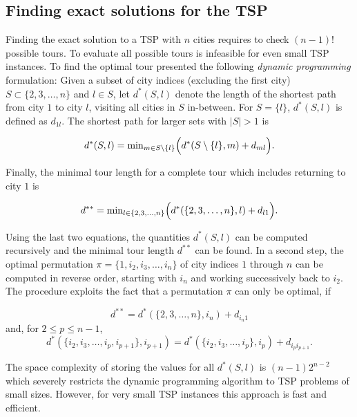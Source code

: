 \documentclass[10pt,a4paper,fleqn]{article}
\begin{document}
\subsection{Finding exact solutions for the TSP}\label{sec:exact}

Finding the exact solution to a TSP with $n$ cities requires to check $(n-1)!$
possible tours. To evaluate all possible tours is infeasible for even small TSP
instances. To find the optimal tour
\cite{Held1962} presented the following
\emph{dynamic programming} formulation: Given a subset of city indices 
(excluding the first city)
$S \subset \{2, 3, \dots, n\}$ and $l \in S$, let $d^*(S, l)$ denote the length of the
shortest path from city $1$ to city $l$, visiting all cities in $S$ in-between.
For $S = \{l\}$, $d^*(S,l)$ is defined as $d_{1l}$. The shortest path for
larger sets with $|S| > 1$ is

\begin{equation}
    d^*(S,l) = \mathrm{min}_{m \in S\setminus\{l\}}\Bigl( d^*(S\setminus\{l\},m) + d_{ml}\Bigl).
\end{equation}

Finally, the minimal tour length for a complete tour which includes returning
to city $1$ is

\begin{equation}
    d^{**} = \mathrm{min}_{l \in \{2,3,\dots,n\}}\Bigl( d^*(\{2,3,\dots,n\}, l)
    + d_{l1}\Bigl). 
\end{equation}

Using the last two equations, the quantities $d^*(S,l)$ can be computed
recursively and the minimal tour length $d^{**}$ can be found.  In a
second step, the optimal permutation $\pi = \{1, i_2, i_3,\dots,i_n\}$
of city indices $1$ through $n$ can be computed in reverse order,
starting with $i_n$ and working successively back to $i_2$. The
procedure exploits the fact that a permutation $\pi$ can only be
optimal, if

\begin{equation}
    d^{**} = d^*(\{2,3,\dots,n\}, i_n) + d_{i_n1}
\end{equation}
and, for $2 \le p \le n-1$,
\begin{equation}
    d^*(\{i_2, i_3,\dots, i_p, i_{p+1}\}, i_{p+1}) = 
    d^*(\{i_2,i_3,\dots,i_p\}, i_p) + d_{i_pi_{p+1}}.
\end{equation}

The space complexity of storing the values for all $d^*(S,l)$ is
$(n-1)2^{n-2}$ which severely restricts the dynamic programming
algorithm to TSP problems of small sizes.  However, for very small TSP
instances this approach is fast and efficient.
\end{document}
